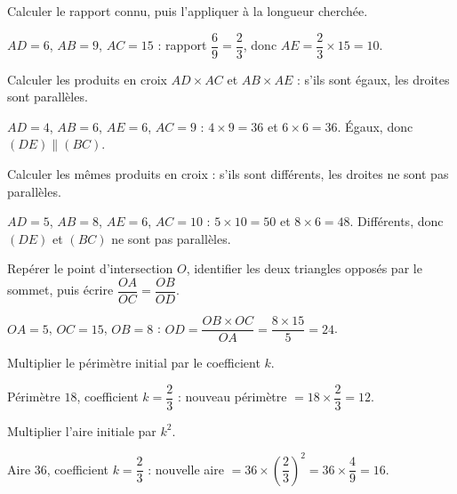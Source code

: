 Calculer le rapport connu, puis l'appliquer à la longueur cherchée.
\begin{exemple}
$AD=6$, $AB=9$, $AC=15$ : rapport $\dfrac69=\dfrac23$, donc $AE=\dfrac23\times15=10$.
\end{exemple}

Calculer les produits en croix $AD\times AC$ et $AB\times AE$ : s'ils sont égaux, les droites
sont parallèles.
\begin{exemple}
$AD=4$, $AB=6$, $AE=6$, $AC=9$ : $4\times9=36$ et $6\times6=36$. Égaux, donc
$(DE)\parallel(BC)$.
\end{exemple}

Calculer les mêmes produits en croix : s'ils sont différents, les droites ne sont pas
parallèles.
\begin{exemple}
$AD=5$, $AB=8$, $AE=6$, $AC=10$ : $5\times10=50$ et $8\times6=48$. Différents, donc $(DE)$
et $(BC)$ ne sont pas parallèles.
\end{exemple}

Repérer le point d'intersection $O$, identifier les deux triangles opposés par le sommet,
puis écrire $\dfrac{OA}{OC}=\dfrac{OB}{OD}$.
\begin{exemple}
$OA=5$, $OC=15$, $OB=8$ : $OD=\dfrac{OB\times OC}{OA}=\dfrac{8\times15}5=24$.
\end{exemple}

Multiplier le périmètre initial par le coefficient $k$.
\begin{exemple}
Périmètre $18$, coefficient $k=\dfrac23$ : nouveau périmètre $=18\times\dfrac23=12$.
\end{exemple}

Multiplier l'aire initiale par $k^{2}$.
\begin{exemple}
Aire $36$, coefficient $k=\dfrac23$ : nouvelle aire $=36\times\left(\dfrac23\right)^{2}=36\times\dfrac49=16$.
\end{exemple}

